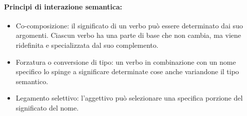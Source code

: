 \paragraph{Principi di interazione semantica:}

\begin{itemize}
  \item Co-composizione: il significato di un verbo può essere determinato dai suo argomenti. Ciascun verbo ha una parte di base che non cambia, ma viene ridefinita e specializzata dal suo complemento. 
  \item Forzatura o conversione di tipo: un verbo in combinazione con un nome specifico lo spinge a significare determinate cose anche variandone il tipo semantico. 
  \item Legamento selettivo: l'aggettivo può selezionare una specifica porzione del significato del nome. 
\end{itemize}
